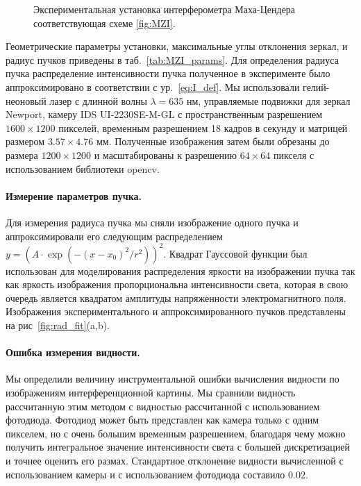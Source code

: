 \begin{figure}[ht]
\caption{Экспериментальная установка интерферометра Маха-Цендера соответствующая схеме \ref{fig:MZI}.}
\label{fig:MZI_exp}
\end{figure}

Геометрические параметры установки, максимальные углы отклонения зеркал, и радиус пучков приведены в таб.~\ref{tab:MZI_params}. Для определения радиуса пучка распределение интенсивности пучка полученное в эксперименте было аппроксимировано в соответствии с ур.~\eqref{eq:I_def}. Мы использовали гелий-неоновый  лазер с длинной волны $\lambda =  635$ нм, управляемые подвижки для зеркал Newport, 
камеру IDS UI-2230SE-M-GL с пространственным разрешением $1600\times1200$ пикселей, временным разрешением 18 кадров в секунду и матрицей размером $3.57\times4.76$ мм. Полученные изображения затем были обрезаны до размера $1200\times1200$ и масштабированы к разрешению $64\times64$ пикселя с использованием библиотеки opencv.

\paragraph{Измерение параметров пучка.}
Для измерения радиуса пучка мы сняли изображение одного пучка и аппроксимировали его следующим распределением $y = \left( A \cdot \exp(-(x - x_0)^2 / r^2) \right) ^2$. Квадрат Гауссовой функции был использован для моделирования распределения яркости на изображении пучка так как яркость изображения пропорциональна интенсивности света, которая в свою очередь является квадратом амплитуды напряженности электромагнитного поля. Изображения экспериментального и аппроксимированного пучков представлены на рис~\ref{fig:rad_fit}(a,b). 

\paragraph{Ошибка измерения видности.}
Мы определили величину инструментальной ошибки вычисления видности по изображениям интерференционной картины. Мы сравнили видность рассчитанную этим методом с видностью рассчитанной с использованием фотодиода. Фотодиод может быть представлен как камера только с одним пикселем, но с очень большим временным разрешением, благодаря чему можно получить интегральное значение интенсивности света с большей дискретизацией и точнее оценить его размах. Стандартное отклонение видности вычисленной с использованием камеры и с использованием фотодиода составило $0.02$.

